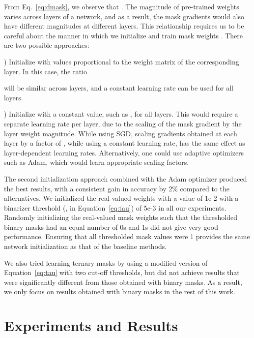 \documentclass{llncs}
\begin{document}
\medskip
{} From Eq.~\ref{eq:dmask}, we observe that . The magnitude of pre-trained weights varies across layers of a network, and as a result, the mask gradients would also have different magnitudes at different layers.
This relationship requires us to be careful about the manner in which we initialize and train mask weights . There are two possible approaches:

) Initialize  with values proportional to the weight matrix  of the corresponding layer. In this case, the ratio 

will be similar across layers, and a constant learning rate can be used for all layers.

) Initialize  with a constant value, such as , for all layers. This would require a separate learning rate per layer, due to the scaling of the mask gradient by the layer weight magnitude.
While using SGD, scaling gradients obtained at each layer by a factor of , while using a constant learning rate, has the same effect as layer-dependent learning rates. Alternatively, one could use adaptive optimizers such as Adam, which would learn appropriate scaling factors.

The second initialization approach combined with the Adam optimizer produced the best results, with a consistent gain in accuracy by  2\% compared to the alternatives.
We initialized the real-valued weights with a value of 1e-2 with a binarizer threshold (, in Equation~\ref{eq:tau}) of 5e-3 in all our experiments. Randomly initializing the real-valued mask weights such that the thresholded binary masks had an equal number of 0s and 1s did not give very good performance. Ensuring that all thresholded mask values were 1 provides the same network initialization as that of the baseline methods.

We also tried learning ternary masks  by using a modified version of Equation~\ref{eq:tau} with two cut-off thresholds, but did not achieve results that were significantly different from those obtained with binary masks. As a result, we only focus on results obtained with binary masks in the rest of this work.






 

\section{Experiments and Results}
\label{sec:results}
\label{subsec:main_results}
\end{document}
